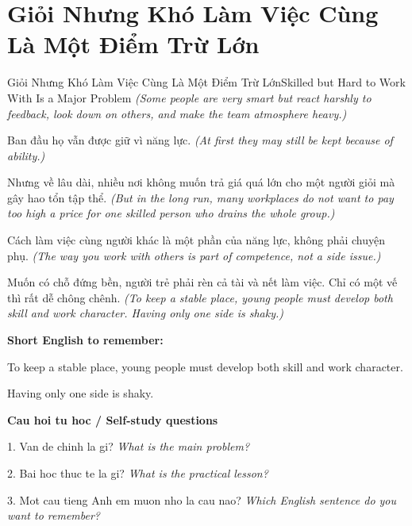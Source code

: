 \section{Giỏi Nhưng Khó Làm Việc Cùng Là Một Điểm Trừ Lớn}
\begin{truyen}{Giỏi Nhưng Khó Làm Việc Cùng Là Một Điểm Trừ Lớn}{Skilled but Hard to Work With Is a Major Problem}
\textit{(Some people are very smart but react harshly to feedback, look down on others, and make the team atmosphere heavy.)}

Ban đầu họ vẫn được giữ vì năng lực.
\textit{(At first they may still be kept because of ability.)}

Nhưng về lâu dài, nhiều nơi không muốn trả giá quá lớn cho một người giỏi mà gây hao tổn tập thể.
\textit{(But in the long run, many workplaces do not want to pay too high a price for one skilled person who drains the whole group.)}

Cách làm việc cùng người khác là một phần của năng lực, không phải chuyện phụ.
\textit{(The way you work with others is part of competence, not a side issue.)}

\end{truyen}

\begin{baihoc}
Muốn có chỗ đứng bền, người trẻ phải rèn cả tài và nết làm việc. Chỉ có một vế thì rất dễ chông chênh.
\textit{(To keep a stable place, young people must develop both skill and work character. Having only one side is shaky.)}
\end{baihoc}

\begin{ghinhoanh}
\textbf{Short English to remember:}

To keep a stable place, young people must develop both skill and work character.

Having only one side is shaky.

\end{ghinhoanh}

\begin{tuhocnhanh}
\textbf{Cau hoi tu hoc / Self-study questions}

1. Van de chinh la gi? \textit{What is the main problem?}

2. Bai hoc thuc te la gi? \textit{What is the practical lesson?}

3. Mot cau tieng Anh em muon nho la cau nao? \textit{Which English sentence do you want to remember?}
\end{tuhocnhanh}
\ngancach

